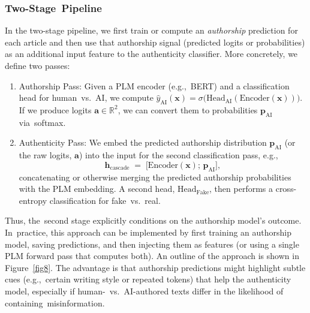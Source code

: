 \documentclass[electronics,article,accept,pdftex,moreauthors,electronics]{Definitions/mdpi}
\begin{document}
\subsubsection{Two-Stage~Pipeline}

In the two-stage pipeline, we first train or compute an \emph{authorship} 
prediction for each article and then use that authorship signal (predicted logits or probabilities) 
as an additional input feature to the authenticity classifier. More concretely, we define 
two passes:
\begin{enumerate}
    \item Authorship Pass: Given a PLM encoder %
    (e.g.,~BERT)
    and a classification head for human~vs.~AI, we compute 
    \(\hat{y}_\text{AI}(\mathbf{x}) = \sigma\!\bigl(\mathrm{Head}_{\text{AI}}(\mathrm{Encoder}(\mathbf{x}))\bigr)\). 
    If we produce logits \(\mathbf{a}\in\mathbb{R}^2\), we can convert them to probabilities 
    \(\mathbf{p}_{\text{AI}}\) via~softmax.

    \item Authenticity Pass: We embed the predicted authorship distribution 
    \(\mathbf{p}_{\text{AI}}\) (or the raw logits, \(\mathbf{a}\)) into the input for the 
    second classification pass, e.g.,
\begin{equation}
    \label{eq:two_stage_pipeline}
    \mathbf{h}_{\text{cascade}} \;=\; \bigl[\mathrm{Encoder}(\mathbf{x});\, \mathbf{p}_{\text{AI}}\bigr],
    \end{equation}
    concatenating or otherwise merging the predicted authorship probabilities with the PLM embedding. 
    A second head, \(\mathrm{Head}_{\text{Fake}}\), then performs a cross-entropy classification 
    for fake~vs.~real.
\end{enumerate}

Thus, the~second stage explicitly conditions on the authorship model’s outcome. In~practice, 
this approach can be implemented by first training an authorship model, saving predictions, 
and then injecting them as features (or using a single PLM forward pass that computes 
both). An outline of the approach is shown in Figure~\ref{fig8}. The advantage is that authorship predictions might highlight subtle cues (e.g.,~certain 
writing style or repeated tokens) that help the authenticity model, especially if 
human-~vs.~AI-authored texts differ in the likelihood of containing~misinformation.
\end{document}
